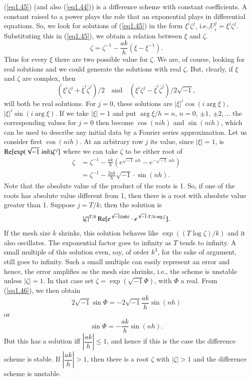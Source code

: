 \medskip
{} (\ref{eq1.45}) (and also (\ref{eq1.44})) is a difference scheme with constant coefficients. A constant raised to a power plays the role that an exponential plays in differential equations. So, we look for solutions of (\ref{eq1.45}) in the form $\xi^i \zeta^j$, i.e.,\pageoriginale $U^j_i = \xi^i \zeta^j$. Substituting this in (\ref{eq1.45}), we obtain a relation between $\xi$ and $\zeta$.
$$
\zeta = \zeta^{-1} - \frac{ak}{h} (\xi - \xi^{-1}). 
$$
Thus for every $\xi$ there are two possible value for $\zeta$. We are, of course, looking for real solutions and we could generate the solutions with real $\zeta$. But, clearly, if $\xi$ and $\zeta$ are complex, then 
$$ 
(\xi^i \zeta^j + {\overline{\xi}}^i {\overline{\zeta}}^j)/2 \quad \text{and} \quad  (\xi^i \zeta^j - {\overline{\xi}}^i {\overline{\zeta}}^j)/ 2 \sqrt{-1},
$$ 
will both be real solutions. For $j=0$, these solutions are $|\xi|^i \cos (i \arg  \xi)$, $|\xi|^i \sin (i \arg \xi)$. If we take $|\xi| =1$ and put $\arg \xi / h = n$, $n=0$, $\pm 1$, $\pm 2, \ldots $ the corresponding values for $j=0$ then become $\cos (nih)$ and $\sin(nih)$, which can be used to describe any initial data by a Fourier series approximation. Let us consider first $\cos(nih)$. At an arbitrary row $j$ its value, since $|\xi| = 1$, is $\operatorname{Re} [\exp (\sqrt{-1} \; inh) \zeta^j]$  where we can take $\zeta$ to be either root of 
\begin{align*}
\zeta & = \zeta^{-1} - \frac{ak}{h} (e^{\sqrt{-1}.nh} - e^{-\sqrt{-1}.nh})\\
& = \zeta^{-1} - \frac{2ak}{h} \sqrt{-1} \cdot \sin (nh). 
\tag{1.46}\label{eq1.46}
\end{align*}
Note that the absolute value of the product of the roots is 1. So, if one of the roots has absolute value different from 1, then there is a root with absolute value greater than 1. Suppose $j = T/k$; then the solution is 
$$
|\zeta|^{T/k} \operatorname{Re} [e^{\sqrt{-1}(\operatorname{inh})} \cdot e^{\sqrt{-1}\cdot T /k \cdot \arg \zeta} ]. 
$$\pageoriginale
If the mesh size $k$ shrinks, this solution behaves like $\exp ((T \log \zeta)/k)$ and it also oscillates. The exponential factor goes to infinity as $T$ tends to infinity. A small multiple of this solution even, say, of order $k^3$, for the sake of argument, still goes to infinity. Such a small multiple can easily represent an error and hence, the error amplifies as the mesh size shrinks, i.e., the scheme is unstable unless $|\zeta| = 1$. In that case set $\zeta = \exp (\sqrt{-1} \Phi)$, with $\Phi$ a real. From (\ref{eq1.46}), we then obtain
$$
2 \sqrt{-1} \sin\Phi = - 2 \sqrt{-1} \frac{ak}{h} \sin(nh)
$$
or
$$
\sin \Phi = - \frac{ak}{h} \sin (nh). 
$$
But this has a solution iff $|\dfrac{ak}{h}| \leq 1$, and hence if this is the case the difference scheme is stable. If $|\dfrac{ak}{h}| > 1$, then there is a root $\zeta$ with $|\zeta| > 1$ and the difference scheme is unstable.

